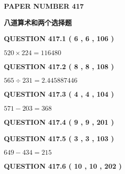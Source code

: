 \documentclass{ctexart}
\begin{document}
   
 {\textbf{ \Large{ PAPER NUMBER  417  }}}
   
   
\vspace{0.2in}
   
   
   
   
   
   
 \vspace{0.2in}
{\LARGE {\textbf{ 八道算术和两个选择题}}}
   
   
  
\vspace{0.2in}
  
{\textbf{\Large{QUESTION
417.1 
 ( 6 , 6 , 106 )
}}}
  
  
 
 

$ %
520 \times  %
224=   %
116480$
 
 
  
\vspace{0.2in}
  
{\textbf{\Large{QUESTION
417.2 
 ( 8 , 8 , 108 )
}}}
  
  
 
 

$ %
565 \div  %
231=   %
2.445887446$
 
 
  
\vspace{0.2in}
  
{\textbf{\Large{QUESTION
417.3 
 ( 4 , 4 , 104 )
}}}
  
  
 
 

$ %
571 -  %
203=   %
368$
 
 
  
\vspace{0.2in}
  
{\textbf{\Large{QUESTION
417.4 
 ( 9 , 9 , 201 )
}}}
  
  
  
\vspace{0.2in}
  
{\textbf{\Large{QUESTION
417.5 
 ( 3 , 3 , 103 )
}}}
  
  
 
 

$ %
649 -  %
434=   %
215$
 
 
  
\vspace{0.2in}
  
{\textbf{\Large{QUESTION
417.6 
 ( 10 , 10 , 202 )
}}}
  
\end{document}
